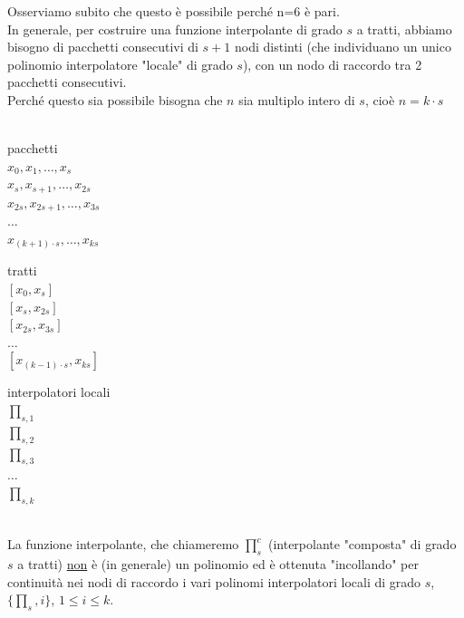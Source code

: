 \documentclass[12pt,a4paper]{article}
\begin{document}
Osserviamo subito che questo è possibile perché n=6 è pari.\\
In generale, per costruire una funzione interpolante di grado $s$ a tratti, abbiamo bisogno di pacchetti consecutivi di $s+1$ nodi distinti (che individuano un unico polinomio interpolatore "locale" di grado $s$), con un nodo di raccordo tra 2 pacchetti consecutivi.\\
Perché questo sia possibile bisogna che $n$ sia multiplo intero di $s$, cioè $n = k \cdot s$\\\\
\begin{minipage}{0.33\textwidth}
\begin{center}
    pacchetti\\
    $x_0, x_1, \dotso, x_s$\\
    $x_s, x_{s+1}, \dotso, x_{2s}$\\
    $x_{2s}, x_{2s+1}, \dotso, x_{3s}$\\
    $\dotso$\\
    $x_{(k+1) \cdot s}, \dotso, x_{ks}$
\end{center}
\end{minipage}
\begin{minipage}{0.33\textwidth}
\begin{center}
    tratti\\
    $[x_0, x_s]$\\
    $[x_s, x_{2s}]$\\
    $[x_{2s}, x_{3s}]$\\
    $\dotso$\\
    $[x_{(k-1) \cdot s}, x_{ks}]$
\end{center}
\end{minipage}
\begin{minipage}{0.33\textwidth}
\begin{center}
    interpolatori locali\\
    $\prod_{s,1}$\\
    $\prod_{s,2}$\\
    $\prod_{s,3}$\\
    $\dotso$\\
    $\prod_{s,k}$
\end{center}
\end{minipage}\\
La funzione interpolante, che chiameremo $\prod_s^c$ (interpolante "composta" di grado $s$ a tratti) \underline{non} è (in generale) un polinomio ed è ottenuta "incollando" per continuità nei nodi di raccordo i vari polinomi interpolatori locali di grado $s$, $\{ \prod_s, i\}$, $1 \leq i \leq k$.\\
\end{document}

